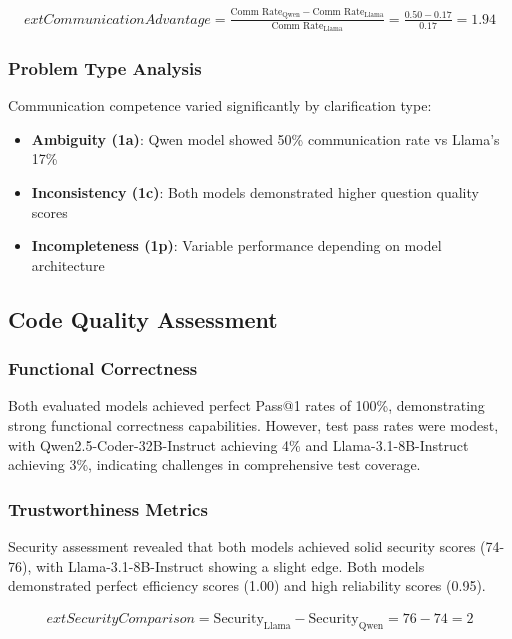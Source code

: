 \documentclass[conference]{IEEEtran}
\begin{document}
\begin{align}
	ext{Communication Advantage} = \frac{\text{Comm Rate}_{\text{Qwen}} - \text{Comm Rate}_{\text{Llama}}}{\text{Comm Rate}_{\text{Llama}}} = \frac{0.50 - 0.17}{0.17} = 1.94
\end{align}

\subsubsection{Problem Type Analysis}

Communication competence varied significantly by clarification type:

\begin{itemize}
    \item \textbf{Ambiguity (1a)}: Qwen model showed 50\% communication rate vs Llama's 17\%
    \item \textbf{Inconsistency (1c)}: Both models demonstrated higher question quality scores
    \item \textbf{Incompleteness (1p)}: Variable performance depending on model architecture
\end{itemize}

\subsection{Code Quality Assessment}

\subsubsection{Functional Correctness}

Both evaluated models achieved perfect Pass@1 rates of 100\%, demonstrating strong functional correctness capabilities. However, test pass rates were modest, with Qwen2.5-Coder-32B-Instruct achieving 4\% and Llama-3.1-8B-Instruct achieving 3\%, indicating challenges in comprehensive test coverage.

\subsubsection{Trustworthiness Metrics}

Security assessment revealed that both models achieved solid security scores (74-76), with Llama-3.1-8B-Instruct showing a slight edge. Both models demonstrated perfect efficiency scores (1.00) and high reliability scores (0.95).

\begin{align}
	ext{Security Comparison} = \text{Security}_{\text{Llama}} - \text{Security}_{\text{Qwen}} = 76 - 74 = 2
\end{align}
\end{document}
